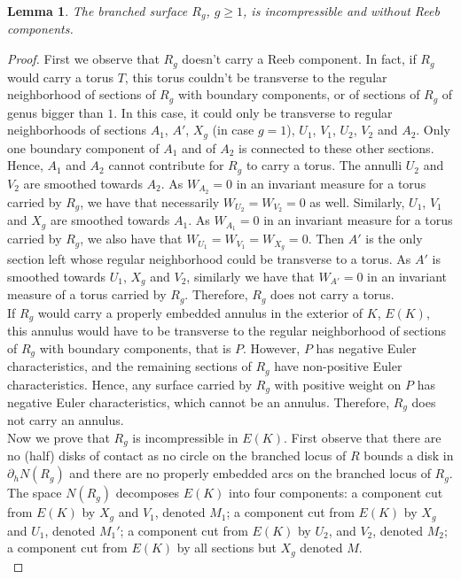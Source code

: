 \documentclass[reqno]{amsart}
\newtheorem{lem}{Lemma}
\theoremstyle{definition}
\theoremstyle{remark}
\begin{document}
\begin{lem}\label{lemma:incompressible}
The branched surface $R_g$,  $g\geq 1$,  is incompressible and without Reeb components.
\end{lem}
\begin{proof}
First we observe that $R_g$ doesn't carry a Reeb component.  In fact,  if $R_g$ would carry a torus $T$,  this torus couldn't be transverse to the regular neighborhood of sections of $R_g$ with boundary components, or of sections of $R_g$ of genus bigger than $1$.  In this case,  it could only be transverse to regular neighborhoods of sections $A_1$, $A'$,  $X_g$ (in case $g=1$),  $U_1$,  $V_1$, $U_2$, $V_2$ and $A_2$.  Only one boundary component of $A_1$ and of $A_2$ is connected to these other sections. Hence, $A_1$ and $A_2$ cannot contribute for $R_g$ to carry a torus.  The annulli $U_2$ and $V_2$ are smoothed towards $A_2$.  As $W_{A_2}=0$ in an invariant measure for a torus carried by $R_g$,  we have that necessarily $W_{U_2}=W_{V_2}=0$ as well.  Similarly,  $U_1$, $V_1$ and $X_g$ are smoothed towards $A_1$.  As $W_{A_1}=0$ in an invariant measure for a torus carried by $R_g$,  we also have that  $W_{U_1}=W_{V_1}=W_{X_g}=0$.  Then $A'$ is the only section left whose regular neighborhood could be transverse to a torus.  As $A'$ is smoothed towards $U_1$,  $X_g$ and $V_2$, similarly we have that $W_{A'}=0$ in an invariant measure of a torus carried by $R_g$.  Therefore,  $R_g$ does not carry a torus.\\

If $R_g$ would carry a properly embedded annulus in the exterior of $K$,  $E(K)$,  this annulus would have to be transverse to the regular neighborhood of sections of $R_g$ with boundary components,  that is $P$. However, $P$ has negative Euler characteristics, and the remaining sections of $R_g$ have non-positive Euler characteristics. Hence, any surface carried by $R_g$ with positive weight on $P$ has negative Euler characteristics, which cannot be an annulus.  Therefore, $R_g$ does not carry an annulus.\\

								
Now we prove that $R_g$ is incompressible in $E(K)$. First observe that there are no (half) disks of contact as no circle on the branched locus of $R$ bounds a disk in $\partial_h N(R_g)$ and there are no properly embedded arcs on the branched locus of $R_g$. The space $N(R_g)$ decomposes $E(K)$ into four components: a component cut from $E(K)$ by $X_g$ and $V_1$, denoted $M_1$; a component cut from $E(K)$ by $X_g$ and $U_1$,  denoted $M_1'$; a component cut from $E(K)$ by $U_2$, and $V_2$, denoted $M_2$; a component cut from $E(K)$ by all sections but $X_g$ denoted $M$.\\


\end{proof}
\end{document}
